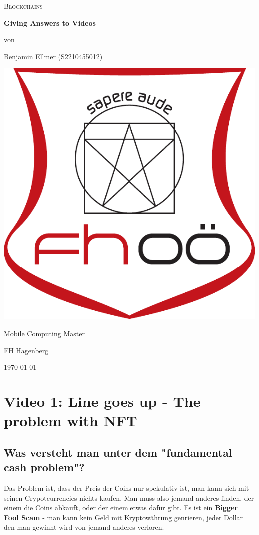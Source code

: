 \documentclass[14pt,a4paper]{extarticle}
\begin{document}
	\begin{titlepage}
		\centering
		{\scshape\LARGE Blockchains \par}
		\vspace{2.5cm}
		{\huge\bfseries Giving Answers to Videos}
		\vfill
		{\normalsize von\par}
		{\normalsize Benjamin Ellmer (\textsc{S2210455012}) \par}
		\vspace{1cm}
		\includegraphics[width=0.3\textheight]{images/logo.pdf} \par
		\vspace{1cm}
		{\large Mobile Computing Master \par}
		{\large FH Hagenberg \par}
		\vfill
		{\large \today\par}
	\end{titlepage}

	\section*{Video 1: Line goes up - The problem with NFT}
	\subsection*{Was versteht man unter dem "fundamental cash problem"?}
	Das Problem ist, dass der Preis der Coins nur spekulativ ist, man kann sich mit seinen Crypotcurrencies nichts kaufen.
	Man muss also jemand anderes finden, der einem die Coins abkauft, oder der einem etwas dafür gibt.
	Es ist ein \textbf{Bigger Fool Scam} - man kann kein Geld mit Kryptowährung genrieren, jeder Dollar den man gewinnt wird von jemand anderes verloren.
\end{document}
